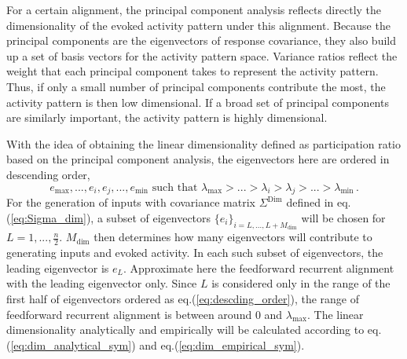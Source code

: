 \documentclass[11pt]{article}
\begin{document}
	For a certain alignment, the principal component analysis reflects directly the dimensionality of the evoked activity pattern under this alignment. Because the principal components are the eigenvectors of response covariance, they also build up a set of basis vectors for the activity pattern space. Variance ratios reflect the weight that each principal component takes to represent the activity pattern. Thus, if only a small number of principal components contribute the most, the activity pattern is then low dimensional. If a broad set of principal components are similarly important, the activity pattern is highly dimensional.  
	
	With the idea of obtaining the linear dimensionality defined as participation ratio based on the principal component analysis, the eigenvectors here are ordered in descending order, 
		\begin{equation} \label{eq:descding_order}
			e_{\text{max}}, ..., e_i, e_j, ..., e_{\text{min}} \, \, \text{such that} \, \, \lambda_{\text{max}} > ...> \lambda_i > \lambda_j > ... > \lambda_{\text{min}} \, .
		\end{equation}
	For the generation of inputs with covariance matrix $\Sigma^{\text{Dim}}$ defined in eq.(\ref{eq:Sigma_dim}), a subset of eigenvectors $\{e_i\}_{i = L, ..., L+M_{\text{dim}}}$ will be chosen for $L=1, ..., \frac{n}{2}$. $M_{\text{dim}}$ then determines how many eigenvectors will contribute to generating inputs and evoked activity. In each such subset of eigenvectors, the leading eigenvector is $e_L$. Approximate here the feedforward recurrent alignment with the leading eigenvector only. Since $L$ is considered only in the range of the first half of eigenvectors ordered as eq.(\ref{eq:descding_order}), the range of feedforward recurrent alignment is between around $0$ and $\lambda_{\text{max}}$. The linear dimensionality analytically and empirically will be calculated according to eq.(\ref{eq:dim_analytical_sym}) and eq.(\ref{eq:dim_empirical_sym}). 
\end{document}
